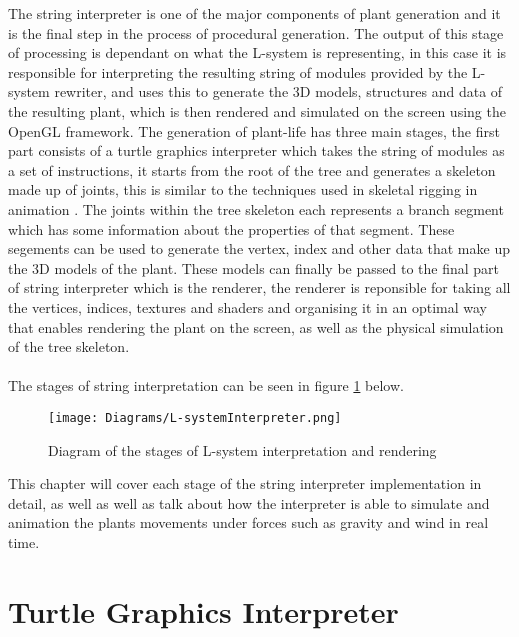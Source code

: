 
\lettrine[lines=3]{T}{}he string interpreter is one of the major components of plant generation and it is the final step in the process of procedural generation. The output of this stage of processing is dependant on what the L-system is representing, in this case it is responsible for interpreting the resulting string of modules provided by the L-system rewriter, and uses this to generate the 3D models, structures and data of the resulting plant, which is then rendered and simulated on the screen using the OpenGL framework. The generation of plant-life has three main stages, the first part consists of a turtle graphics interpreter which takes the string of modules as a set of instructions, it starts from the root of the tree and generates a skeleton made up of joints, this is similar to the techniques used in skeletal rigging in animation \cite{gregory2014game}. The joints within the tree skeleton each represents a branch segment which has some information about the properties of that segment. These segements can be used to generate the vertex, index and other data that make up the 3D models of the plant. These models can finally be passed to the final part of string interpreter which is the renderer, the renderer is reponsible for taking all the vertices, indices, textures and shaders and organising it in an optimal way that enables rendering the plant on the screen, as well as the physical simulation of the tree skeleton. \\
\\
The stages of string interpretation can be seen in figure \ref{l-system interpreter} below. 

\begin{figure}[htbp]
	{\centering
		\vspace{7px}
		\texttt{[image: Diagrams/L-systemInterpreter.png]}
		\caption{Diagram of the stages of L-system interpretation and rendering} \label{l-system interpreter}
	}
\end{figure}

\noindent
This chapter will cover each stage of the string interpreter implementation in detail, as well as well as talk about how the interpreter is able to simulate and animation the plants movements under forces such as gravity and wind in real time. \\

\section{Turtle Graphics Interpreter}

